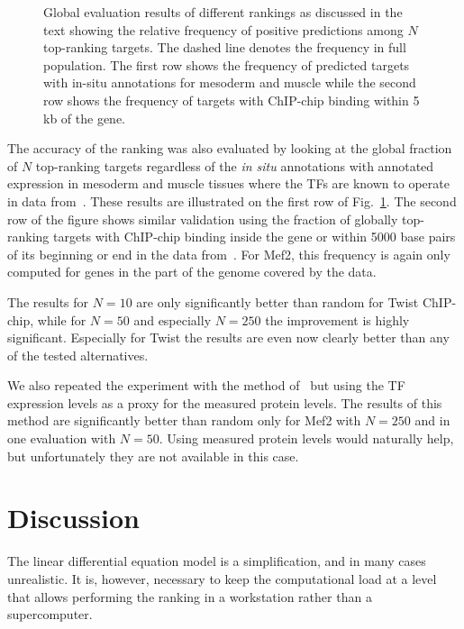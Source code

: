 \documentclass{pnastwo}
\begin{document}
\begin{article}
\begin{figure}[htb]
  \caption{Global evaluation results of different rankings as
    discussed in the text showing the relative frequency of positive
    predictions among $N$ top-ranking targets.  The dashed line
    denotes the frequency in full population.  The first row shows the
    frequency of predicted targets with in-situ annotations for
    mesoderm and muscle while the second row shows the frequency of
    targets with ChIP-chip binding within 5 kb of the gene.
  }
  \label{fig:dros_global_evaluation}
\end{figure}

The accuracy of the ranking was also evaluated by looking at the
global fraction of $N$ top-ranking targets regardless of the
\emph{in situ} annotations
with annotated expression in
mesoderm and muscle tissues where the TFs are known to operate in data
from~\cite{Tomancak2002}.  These results are illustrated on the first
row of Fig.~\ref{fig:dros_global_evaluation}.  The second row of the
figure shows similar validation using the fraction of globally top-ranking
targets with ChIP-chip binding inside the gene or within 5000 base
pairs of its beginning or end in the data
from~\cite{Sandmann2006a,Sandmann2007a}.  For Mef2, this frequency is
again only computed for genes in the part of the genome covered by the data.

The results for $N=10$ are only significantly better than random for
Twist ChIP-chip, while for $N=50$ and especially $N=250$ the
improvement is highly significant.  Especially for Twist the results
are even now clearly better than any of the tested alternatives.

We also repeated the experiment with the method of~\cite{Gatta2008}
but using the TF expression levels as a proxy for the measured protein
levels.  The results of this method are significantly better than
random only for Mef2 with $N=250$ and in one evaluation with $N=50$.
Using measured protein levels would naturally help, but unfortunately
they are not available in this case.

\section{Discussion}

The linear differential equation model is a simplification, and in
many cases unrealistic. It is, however, necessary to keep the
computational load at a level that allows performing the ranking in a
workstation rather than a supercomputer.


\end{article}
\end{document}
